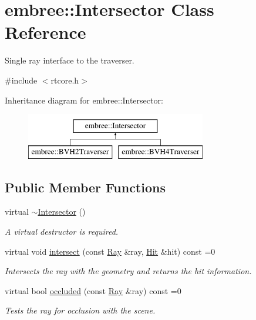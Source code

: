 \hypertarget{classembree_1_1_intersector}{
\section{embree::Intersector Class Reference}
\label{classembree_1_1_intersector}
}


Single ray interface to the traverser.  




{\ttfamily \#include $<$rtcore.h$>$}

Inheritance diagram for embree::Intersector:\begin{figure}[H]
\begin{center}
\leavevmode
\includegraphics[height=2.000000cm]{classembree_1_1_intersector}
\end{center}
\end{figure}
\subsection*{Public Member Functions}
\begin{DoxyCompactItemize}
\item 
virtual \hyperlink{classembree_1_1_intersector_aef0184a1283800328629df73372c35b5}{$\sim$Intersector} ()
\begin{DoxyCompactList}\small\item\em A virtual destructor is required. \item\end{DoxyCompactList}\item 
virtual void \hyperlink{classembree_1_1_intersector_ae488adb126f9e7f48ca45e4e776a2926}{intersect} (const \hyperlink{structembree_1_1_ray}{Ray} \&ray, \hyperlink{structembree_1_1_hit}{Hit} \&hit) const =0
\begin{DoxyCompactList}\small\item\em Intersects the ray with the geometry and returns the hit information. \item\end{DoxyCompactList}\item 
virtual bool \hyperlink{classembree_1_1_intersector_a47cf036c3eab7060590c72e7bb51255c}{occluded} (const \hyperlink{structembree_1_1_ray}{Ray} \&ray) const =0
\begin{DoxyCompactList}\small\item\em Tests the ray for occlusion with the scene. \item\end{DoxyCompactList}\end{DoxyCompactItemize}


